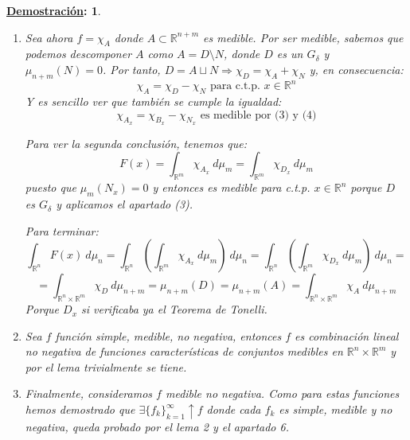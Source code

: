 \documentclass[10pt,a4paper,openright]{book}
\theoremstyle{break}
\newtheorem*{demo}{\underline{Demostración}:}
\newcommand{\dif}[1]{\ d#1}
\begin{document}
\begin{demo}
\begin{enumerate}
Para la segunda consecuencia basta ver que:
$$0 \le F \left(x\right) = \int_{\mathbb{R}^m} \chi_{N_x} \dif{\mu_m} \le \int_{\mathbb{R}^m} \chi_{G_x} \dif{\mu_m} = 0 \text{ c.t.p. } \in \mathbb{R}^n$$
Por lo que, en particular, $F$ es medible.

Y, por último, hay que ver que la integral se puede iterar:
$$\int_{\mathbb{R}^n \times \mathbb{R}^m} \chi_N \dif{\mu_{n+m}} = 0 = \int_{\mathbb{R}^n} \underbrace{F \left(x\right)}_{=0} \dif{\mu_n} = \int_{\mathbb{R}^n} \left(\int_{\mathbb{R}^m} \chi_{N_x} \dif{\mu_m} \right) \dif{\mu_n} $$

\item Sea ahora $f = \chi_A$ donde $A \subset \mathbb{R}^{n+m}$ es medible. Por ser medible, sabemos que podemos descomponer $A$ como $A = D \setminus N$, donde $D$ es un $G_\delta $ y $\mu_{n+m} \left(N\right) = 0$. Por tanto, $D = A \sqcup N \Rightarrow \chi_D = \chi_A + \chi_N$ y, en consecuencia:
$$\chi_A = \chi_D - \chi_N \text{ para c.t.p. } x \in \mathbb{R}^n$$
Y es sencillo ver que también se cumple la igualdad:
$$\chi_{A_x}= \chi_{B_x} - \chi_{N_x} \text{ es medible por (3) y (4)}$$

Para ver la segunda conclusión, tenemos que: 
$$F \left(x\right) = \int_{\mathbb{R}^m} \chi_{A_x} \dif{\mu_m} = \int_{\mathbb{R}^m} \chi_{D_x} \dif{\mu_m}$$
puesto que $\mu_m \left(N_x\right) = 0$ y entonces es medible para c.t.p. $x \in \mathbb{R}^n$ porque $D$ es $G_\delta$ y aplicamos el apartado (3).

Para terminar:
$$\int_{\mathbb{R}^n} F \left(x\right) \dif{\mu_n} = \int_{\mathbb{R}^n} \left( \int_{\mathbb{R}^m} \chi_{A_x} \dif{\mu_m} \right) \dif{\mu_n} = \int_{\mathbb{R}^n} \left(\int_{\mathbb{R}^m} \chi_{D_x} \dif{\mu_m} \right) \dif{\mu_n} = $$
$$= \int_{\mathbb{R}^n \times \mathbb{R}^m} \chi_{D} \dif{\mu_{n+m}} = \mu_{n+m} \left(D\right) = \mu_{n+m} \left(A\right) = \int_{\mathbb{R}^n \times \mathbb{R}^m} \chi_A \dif{\mu_{n+m}} $$
Porque $D_x$ si verificaba ya el Teorema de Tonelli.

\item Sea $f$ función simple, medible, no negativa, entonces $f$ es combinación lineal no negativa de funciones características de conjuntos medibles en $\mathbb{R}^n \times \mathbb{R}^m$ y por el lema trivialmente se tiene.

\item Finalmente, consideramos $f$ medible no negativa. Como para estas funciones hemos demostrado que $ \exists \{f_k\}_{k=1}^{\infty}\uparrow f$ donde cada $f_k$ es simple, medible y no negativa, queda probado por el lema 2 y el apartado 6.
\end{enumerate} 
\end{demo}
\end{document}
